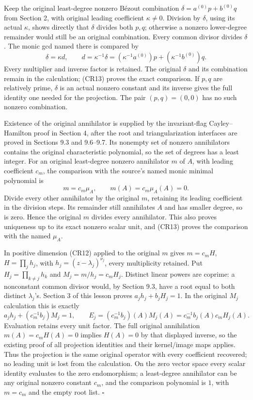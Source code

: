 \documentclass[
  11pt,
]{article}
\begin{document}
Keep the original least-degree nonzero Bézout combination
\(\delta=a^{(0)}p+b^{(0)}q\) from Section 2, with original leading
coefficient \(\kappa\ne0\). Division by \(\delta\), using its actual
\(\kappa\), shows directly that \(\delta\) divides both \(p,q\);
otherwise a nonzero lower-degree remainder would still be an original
combination. Every common divisor divides \(\delta\). The monic gcd
named there is compared by \[
 \delta=\kappa d,\qquad
 d=\kappa^{-1}\delta
   =(\kappa^{-1}a^{(0)})p+(\kappa^{-1}b^{(0)})q .                \tag{CR14}
\] Every multiplier and inverse factor is retained. The original
\(\delta\) and its combination remain in the calculation; (CR13) proves
the exact comparison. If \(p,q\) are relatively prime, \(\delta\) is an
actual nonzero constant and its inverse gives the full identity one
needed for the projection. The pair \((p,q)=(0,0)\) has no such nonzero
combination.

Existence of the original annihilator is supplied by the invariant-flag
Cayley--Hamilton proof in Section 4, after the root and
triangularization interfaces are proved in Sections 9.3 and 9.6--9.7.
Its nonempty set of nonzero annihilators contains the original
characteristic polynomial, so the set of degrees has a least integer.
For an original least-degree nonzero annihilator \(m\) of \(A\), with
leading coefficient \(c_m\), the comparison with the source's named
monic minimal polynomial is \[
 m=c_m\mu_A,\qquad m(A)=c_m\mu_A(A)=0.                         \tag{CR15}
\] Divide every other annihilator by the original \(m\), retaining its
leading coefficient in the division steps. Its remainder still
annihilates \(A\) and has smaller degree, so is zero. Hence the original
\(m\) divides every annihilator. This also proves uniqueness up to its
exact nonzero scalar unit, and (CR13) proves the comparison with the
named \(\mu_A\).

In positive dimension (CR12) applied to the original \(m\) gives
\(m=c_m H\), \(H=\prod_j h_j\), with \(h_j=(z-\lambda_j)^{\nu_j}\),
every multiplicity retained. Put \(H_j=\prod_{k\ne j}h_k\) and
\(M_j=m/h_j=c_m H_j\). Distinct linear powers are coprime: a nonconstant
common divisor would, by Section 9.3, have a root equal to both distinct
\(\lambda_j\)'s. Section 3 of this lesson proves \(a_jh_j+b_jH_j=1\). In
the original \(M_j\) calculation this is exactly \[
 a_jh_j+(c_m^{-1}b_j)M_j=1,\qquad
 E_j=(c_m^{-1}b_j)(A)M_j(A)
    =c_m^{-1}b_j(A)c_m H_j(A).                                \tag{CR16}
\] Evaluation retains every unit factor. The full original annihilation
\(m(A)=c_mH(A)=0\) implies \(H(A)=0\) by that displayed inverse, so the
existing proof of all projection identities and their kernel/image maps
applies. Thus the projection is the same original operator with every
coefficient recovered; no leading unit is lost from the calculation. On
the zero vector space every scalar identity evaluates to the zero
endomorphism; a least-degree annihilator can be any original nonzero
constant \(c_m\), and the comparison polynomial is \(1\), with \(m=c_m\)
and the empty root list. \(\square\)
\end{document}
